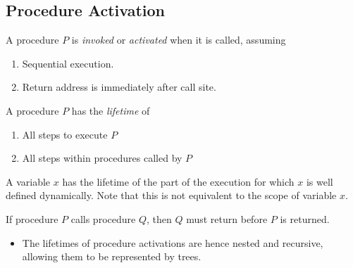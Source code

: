 \subsection{Procedure Activation}

\begin{definition}
    A procedure $P$ is \textit{invoked} or \textit{activated} when it is called, assuming
    \begin{enumerate}
        \item Sequential execution.
        \item Return address is immediately after call site.
    \end{enumerate}
\end{definition}

\begin{definition}
    A procedure $P$ has the \textit{lifetime} of
    \begin{enumerate}
        \item All steps to execute $P$
        \item All steps within procedures called by $P$
    \end{enumerate}
\end{definition}

\begin{definition}
    A variable $x$ has the lifetime of the part of the execution for which $x$ is well defined dynamically. Note that this is not equivalent to the scope of variable $x$.
\end{definition}

\begin{definition}
    If procedure $P$ calls procedure $Q$, then $Q$ must return before $P$ is returned.
    \begin{itemize}
        \item The lifetimes of procedure activations are hence nested and recursive, allowing them to be represented by trees.
    \end{itemize}
\end{definition}


